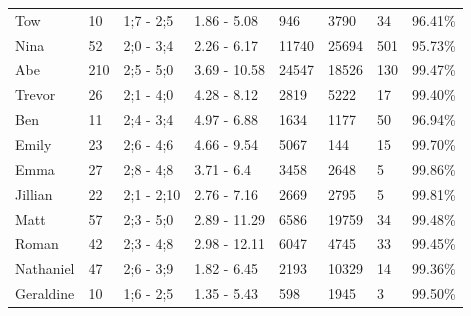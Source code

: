 \begin{table}[h]
\begin{tabular}{llllllll}
Tow & 10 & 1;7 - 2;5 & 1.86 - 5.08 & 946 & 3790 & 34 & 96.41\% \\
Nina & 52 & 2;0 - 3;4 & 2.26 - 6.17 & 11740 & 25694 & 501 & 95.73\% \\
Abe & 210 & 2;5 - 5;0 & 3.69 - 10.58 & 24547 & 18526 & 130 & 99.47\% \\
Trevor & 26 & 2;1 - 4;0 & 4.28 - 8.12 & 2819 & 5222 & 17 & 99.40\% \\
Ben & 11 & 2;4 - 3;4 & 4.97 - 6.88 & 1634 & 1177 & 50 & 96.94\% \\
Emily & 23 & 2;6 - 4;6 & 4.66 - 9.54 & 5067 & 144 & 15 & 99.70\% \\
Emma & 27 & 2;8 - 4;8 & 3.71 - 6.4 & 3458 & 2648 & 5 & 99.86\% \\
Jillian & 22 & 2;1 - 2;10 & 2.76 - 7.16 & 2669 & 2795 & 5 & 99.81\% \\
Matt & 57 & 2;3 - 5;0 & 2.89 - 11.29 & 6586 & 19759 & 34 & 99.48\% \\
Roman & 42 & 2;3 - 4;8 & 2.98 - 12.11 & 6047 & 4745 & 33 & 99.45\% \\
Nathaniel & 47 & 2;6 - 3;9 & 1.82 - 6.45 & 2193 & 10329 & 14 & 99.36\% \\
Geraldine & 10 & 1;6 - 2;5 & 1.35 - 5.43 & 598 & 1945 & 3 & 99.50\% \\ \hline
\end{tabular}
\end{table}
\FloatBarrier

